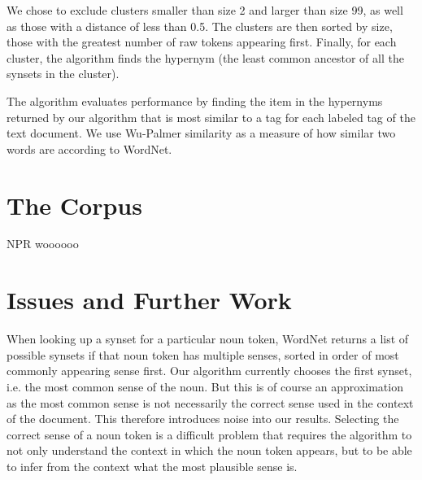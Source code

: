 \documentclass[12pt]{article}
\begin{document}
    We chose to exclude clusters smaller than size 2 and larger than size 99, as well as those with a distance of less than 0.5. The clusters are then sorted by size, those with the greatest number of raw tokens appearing first. Finally, for each cluster, the algorithm finds the hypernym (the least common ancestor of all the synsets in the cluster).

    The algorithm evaluates performance by finding the item in the hypernyms returned by our algorithm that is most similar to a tag for each labeled tag of the text document. We use Wu-Palmer similarity as a measure of how similar two words are according to WordNet.

    \section{The Corpus}

    NPR woooooo

    \section{Issues and Further Work}

    When looking up a synset for a particular noun token, WordNet returns a list of possible synsets if that noun token has multiple senses, sorted in order of most commonly appearing sense first. Our algorithm currently chooses the first synset, i.e. the most common sense of the noun. But this is of course an approximation as the most common sense is not necessarily the correct sense used in the context of the document. This therefore introduces noise into our results. Selecting the correct sense of a noun token is a difficult problem that requires the algorithm to not only understand the context in which the noun token appears, but to be able to infer from the context what the most plausible sense is.



    
    

    
\end{document}
